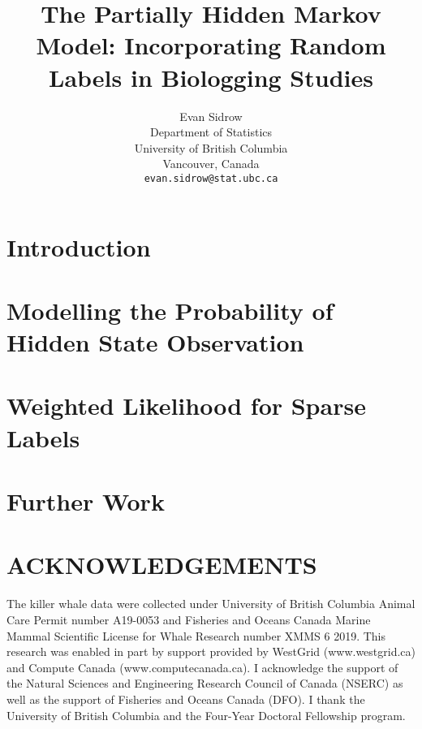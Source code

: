 \documentclass{article}
\title{The Partially Hidden Markov Model: Incorporating Random Labels in Biologging Studies}
\author{
  Evan Sidrow \\
  Department of Statistics\\
  University of British Columbia\\
  Vancouver, Canada \\
  \texttt{evan.sidrow@stat.ubc.ca} \\
}
\begin{document}
\maketitle

\section{Introduction}
\label{sec:intro_ss}


\section{Modelling the Probability of Hidden State Observation}
\label{sec:prob_obs_ss}


\section{Weighted Likelihood for Sparse Labels}
\label{sec:w_like_ss}


\section{Further Work}
\label{sec:fut_ss}


\section*{ACKNOWLEDGEMENTS}
The killer whale data were collected under University of British Columbia Animal Care Permit number A19-0053 and Fisheries and Oceans Canada Marine Mammal Scientific License for Whale Research number XMMS 6 2019.
This research was enabled in part by support provided by WestGrid (www.westgrid.ca) and Compute Canada (www.computecanada.ca).
I acknowledge the support of the Natural Sciences and Engineering Research Council of Canada (NSERC) as well as the support of Fisheries and Oceans Canada (DFO). 
I thank the University of British Columbia and the Four-Year Doctoral Fellowship program.
%
\newpage

%

\begin{appendix}



\end{appendix}
\end{document}
